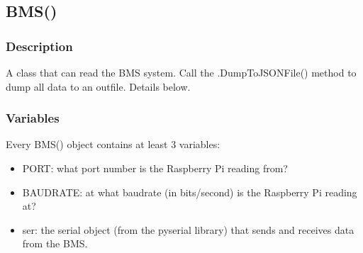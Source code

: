 \subsection{BMS()}
\subsubsection{Description}
A class that can read the BMS system. Call the .DumpToJSONFile() method to dump all data to an outfile. Details below.
\subsubsection{Variables}
Every BMS() object contains at least 3 variables:
\begin{itemize}
	\item PORT: what port number is the Raspberry Pi reading from?
	\item BAUDRATE: at what baudrate (in bits/second) is the Raspberry Pi reading at?
	\item ser: the serial object (from the pyserial library) that sends and receives data from the BMS.
\end{itemize}

